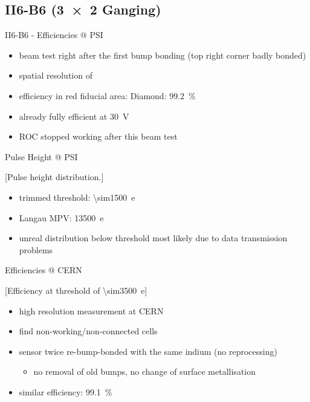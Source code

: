\subsection{II6-B6 (\SI{3x2}{} Ganging)}
\begin{frame}{II6-B6 - Efficiencies @ PSI}

	
	\begin{itemize}\itemfill
		\item beam test right after the first bump bonding (top right corner badly bonded)
		\item spatial resolution of 
		\item efficiency in red fiducial area: Diamond: \SI{99.2}{\%}
		\item already fully efficient at \SI{30}{\volt}
		\item ROC stopped working after this beam test
	\end{itemize}
	
\end{frame}
\begin{frame}{Pulse Height @ PSI}

	[Pulse height distribution.]	
	
	\begin{itemize}\itemfill
		\item trimmed threshold: \SI{\sim1500}{e}
		\item Langau MPV: \SI{13500}{e}
		\item unreal distribution below threshold most likely due to data transmission problems
	\end{itemize}
	
\end{frame}
\begin{frame}{Efficiencies @ CERN}

	\vspace*{-2ex}[Efficiency at threshold of \SI{\sim3500}{e}]\vspace*{-2ex}
	
	\begin{itemize}\itemfill
		\item high resolution measurement at CERN
		\item find non-working/non-connected cells
		\item sensor twice re-bump-bonded with the same indium (no reprocessing)
		\begin{itemize}
			\item no removal of old bumps, no change of surface metallisation
		\end{itemize}
		\item similar efficiency: \SI{99.1}{\%}
	\end{itemize}
	
\end{frame}
